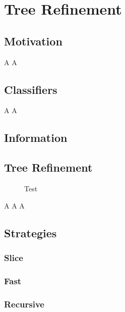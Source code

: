 \chapter{Tree Refinement}
\label{chap:tree}

	\clearpage
	
	\section{Motivation}
	
		A\clearpage
		A\clearpage
	
	\section{Classifiers}
	
		A\clearpage
		A\clearpage

	\section{Information}
	
		\clearpage

	\section{Tree Refinement}
	
		\begin{figure}[ht!]
			\centering
			
			\caption{Test}
			\label{fig:tree:binpackNOP}
		\end{figure}
	
		\clearpage
		A\clearpage
		A\clearpage
		A\clearpage
		
	\section{Strategies}
	
		\subsection{Slice}
			\clearpage
		
		\subsection{Fast}
			\clearpage
		
		\subsection{Recursive}
			\clearpage
			
